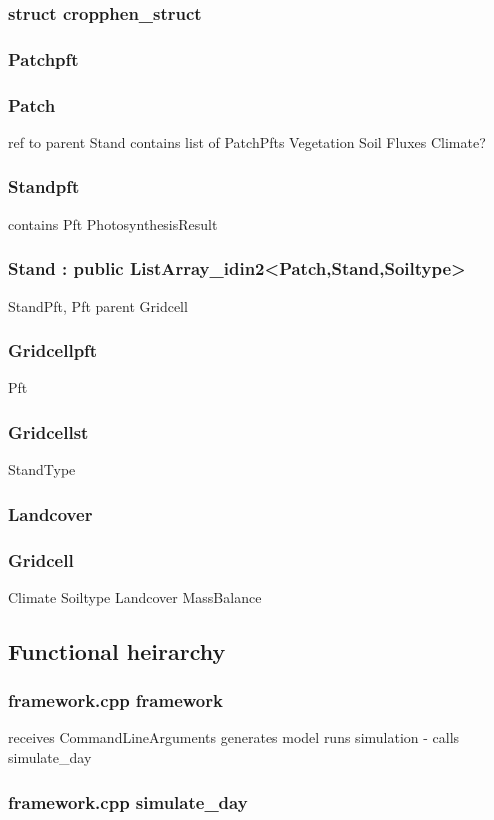 \subsubsection{struct cropphen_struct}
\subsubsection{Patchpft}
\subsubsection{Patch}
ref to parent Stand
contains list of PatchPfts
Vegetation
Soil
Fluxes
Climate?
\subsubsection{Standpft}
contains Pft
PhotosynthesisResult
\subsubsection{Stand : public ListArray_idin2<Patch,Stand,Soiltype>}
StandPft, Pft
parent Gridcell

\subsubsection{Gridcellpft}
Pft
\subsubsection{Gridcellst}
StandType
\subsubsection{Landcover}
\subsubsection{Gridcell}
Climate
Soiltype
Landcover
MassBalance
\subsection{Functional heirarchy}
\subsubsection{framework.cpp framework}
receives CommandLineArguments
generates model
runs simulation - calls simulate\_day
\subsubsection{framework.cpp simulate\_day}
